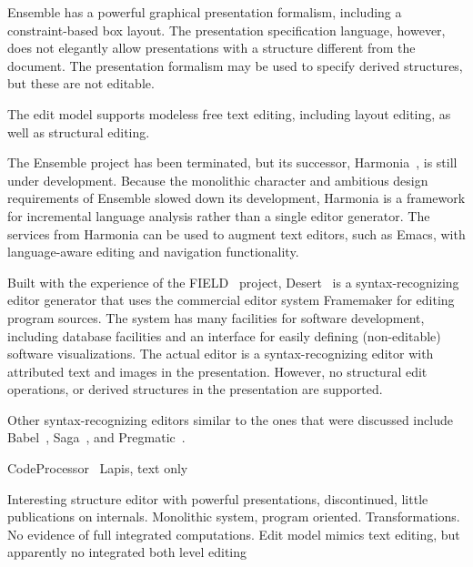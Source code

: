 \documentclass{entcs}
\begin{document}
Ensemble has a powerful graphical presentation formalism, including a constraint-based box layout. The presentation specification language, however, does not elegantly allow presentations with a structure different from the document. The presentation formalism may be used to specify derived structures, but these are not editable.

The edit model supports modeless free text editing, including layout editing, as well as structural editing.

The Ensemble project has been terminated, but its successor, Harmonia~\cite{boshernitsan01harmonia}, is still under development. Because the monolithic character and ambitious design requirements of Ensemble slowed down its development, Harmonia is a framework for incremental language analysis rather than a single editor generator. The services from Harmonia can be used to augment text editors, such as Emacs, with language-aware editing and navigation functionality.


Built with the experience of the FIELD~\cite{reiss94field} project, Desert~\cite{reiss99desert} is a syntax-recognizing editor generator that uses the commercial editor system Framemaker for editing program sources. The system has many facilities for software development, including database facilities and an interface for easily defining (non-editable) software visualizations. The actual editor is a syntax-recognizing editor with attributed text and images in the presentation. However, no structural edit operations, or derived structures in the presentation are supported.


Other syntax-recognizing editors similar to the ones that were discussed include  Babel~\cite{horton81babel}, Saga~\cite{campbell84saga}, and Pregmatic~\cite{brand92pregmatic}.


\bc
CodeProcessor~\cite{codeprocessor}
Lapis, text only

Interesting structure editor with powerful presentations, discontinued, little publications on
internals. Monolithic system, program oriented. Transformations. No evidence of full 
integrated computations. Edit model mimics text editing, but apparently no integrated
both level editing
\ec
\end{document}
